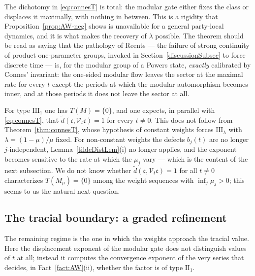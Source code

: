 \documentclass[twoside,11pt,letter]{article}
\def\cV{{\mathcal{V}}}
\def\fc{{\mathfrak{c}}}
\theoremstyle{definition}
\theoremstyle{definition}
\theoremstyle{plain}
\newenvironment{remark}[1][Remark.]{\begin{trivlist}
\item[\hskip \labelsep {\bfseries #1}]}{\end{trivlist}}
\begin{document}
\begin{remark}
\label{rem:connes-recovery}
The dichotomy in \eqref{eq:connesT} is total: the modular gate either fixes the class or displaces it maximally, with nothing in between. This is a rigidity that Proposition~\ref{prop:AW-neg} shows is unavailable for a general party-local dynamics, and it is what makes the recovery of $\lambda$ possible. The theorem should be read as saying that the pathology of Reents \cite{R74} --- the failure of strong continuity of product one-parameter groups, invoked in Section~\ref{discussionSubsec} to force discrete time --- is, for the modular group of a Powers state, \emph{exactly} calibrated by Connes' invariant: the one-sided modular flow leaves the sector at the maximal rate for every $t$ except the periods at which the modular automorphism becomes inner, and at those periods it does not leave the sector at all.
\end{remark}

\begin{remark}
\label{rem:III1}
For type $\mathrm{III}_1$ one has $T(M) = \{0\}$, and one expects, in parallel with \eqref{eq:connesT}, that $\tilde d(\fc, \cV_t\fc) = 1$ for every $t \neq 0$. This does not follow from Theorem~\ref{thm:connesT}, whose hypothesis of constant weights forces $\mathrm{III}_\lambda$ with $\lambda = (1-\mu)/\mu$ fixed. For non-constant weights the defects $b_j(t)$ are no longer $j$-independent, Lemma~\ref{tildeDistLem}(i) no longer applies, and the exponent becomes sensitive to the rate at which the $\mu_j$ vary --- which is the content of the next subsection. We do not know whether $\tilde d(\fc, \cV_t\fc) = 1$ for all $t\neq 0$ characterizes $T(M_\mu) = \{0\}$
among the weight sequences with $\inf_j \mu_j > 0$; this seems to us the natural next question.
\end{remark}

\subsection{The tracial boundary: a graded refinement}
\label{sec:AW-tracial}

The remaining regime is the one in which the weights approach the tracial value. Here the displacement exponent of the modular gate does not distinguish values of $t$ at all; instead it computes the convergence exponent of the very series that decides, in Fact~\ref{fact:AW}(ii), whether the factor is of type $\mathrm{II}_1$.
\end{document}
